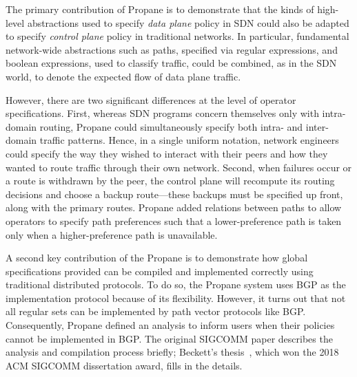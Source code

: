 \documentclass[sigconf]{acmart}
\begin{document}
The primary contribution of Propane is to demonstrate that the kinds
of high-level abstractions used to specify \emph{data plane} policy in SDN could also be adapted to specify
\emph{control plane} policy in traditional networks. In particular,
fundamental network-wide abstractions such as paths, specified via
regular expressions, and boolean expressions, used to
classify traffic, could be combined, as in the SDN world, to denote
the expected flow of data plane traffic.  

However, there are two significant
differences at the level of operator specifications.  First, whereas SDN
programs concern themselves only with intra-domain routing,
Propane could simultaneously specify
both intra- and inter-domain traffic patterns.  Hence, in a single
uniform
notation, network engineers could specify the way they wished to
interact with their peers and how they wanted to route traffic through
their own network.  Second, when failures
occur or a route is withdrawn by the peer, the control plane will recompute its routing decisions and
choose a backup route---these backups must be specified up front,
along with the primary routes.  Propane added relations between paths
to allow operators to specify path preferences such that a lower-preference path is taken only when a higher-preference path is unavailable.

A second key contribution of the Propane is to
demonstrate how global specifications provided can be compiled
and implemented correctly using traditional distributed protocols.  
To do so, the Propane system uses BGP as the
implementation protocol because of its flexibility.  However,
it turns out that not all regular sets can be implemented by path vector protocols
like BGP.  Consequently, Propane defined an analysis to inform users when
their policies cannot be implemented in BGP.  The original
SIGCOMM paper describes the analysis and compilation process briefly;
Beckett's thesis~\cite{beckett:thesis}, which won the 2018 ACM SIGCOMM
dissertation award, fills in the details.

\end{document}
